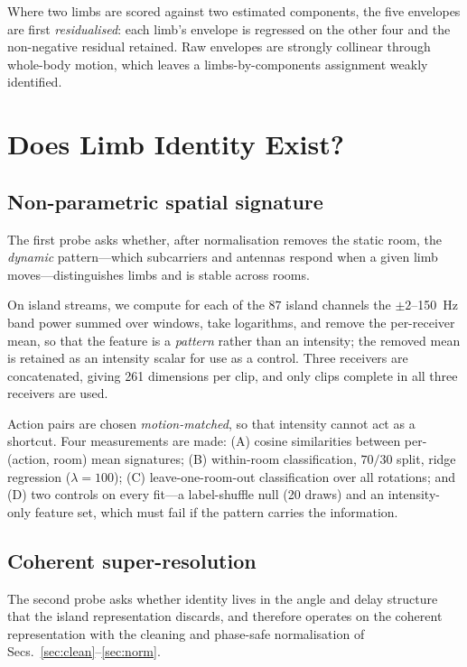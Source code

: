 \documentclass[conference]{IEEEtran}
\begin{document}
Where two limbs are scored against two estimated components, the five envelopes
are first \emph{residualised}: each limb's envelope is regressed on the other
four and the non-negative residual retained. Raw envelopes are strongly
collinear through whole-body motion, which leaves a limbs-by-components
assignment weakly identified.

\section{Does Limb Identity Exist?}
\label{sec:id}

\subsection{Non-parametric spatial signature}
\label{sec:sigprobe}

The first probe asks whether, after normalisation removes the static room, the
\emph{dynamic} pattern---which subcarriers and antennas respond when a given
limb moves---distinguishes limbs and is stable across rooms.

On island streams, we compute for each of the $87$ island channels the
$\pm 2$--\SI{150}{\hertz} band power summed over windows, take logarithms, and
remove the per-receiver mean, so that the feature is a \emph{pattern} rather
than an intensity; the removed mean is retained as an intensity scalar for use
as a control. Three receivers are concatenated, giving \num{261} dimensions per
clip, and only clips complete in all three receivers are used.

Action pairs are chosen \emph{motion-matched}, so that intensity cannot act as
a shortcut. Four measurements are made: (A) cosine similarities between
per-(action, room) mean signatures; (B) within-room classification, $70/30$
split, ridge regression ($\lambda = 100$); (C) leave-one-room-out
classification over all rotations; and (D) two controls on every fit---a
label-shuffle null (\num{20} draws) and an intensity-only feature set, which
must fail if the pattern carries the information.

\subsection{Coherent super-resolution}
\label{sec:coherent}

The second probe asks whether identity lives in the angle and delay structure
that the island representation discards, and therefore operates on the coherent
representation with the cleaning and phase-safe normalisation of
Secs.~\ref{sec:clean}--\ref{sec:norm}.
\end{document}
